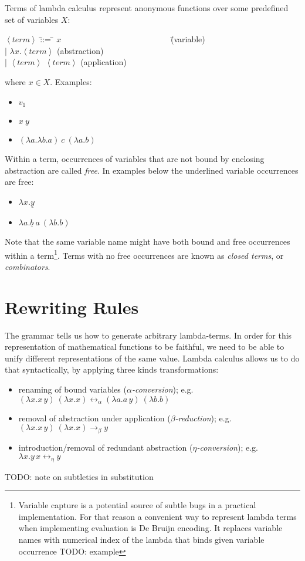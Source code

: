 \documentclass[11pt,twoside,a4paper]{article} %
\newcommand{\nonterm}[1]{$\left<#1\right>$}
\newcommand{\alt}[0]{$|$}
\begin{document}
Terms of lambda calculus represent anonymous functions over some predefined set of 
variables $X$:
\begin{tabbing}
\nonterm{term} \= ::=  \= $x$~~~~~~~~~~~~~~~~~~~~~~~~~~ \= (variable)    \\
               \> \alt \> $\lambda x.$\nonterm{term}    \> (abstraction) \\
               \> \alt \> \nonterm{term} \nonterm{term} \> (application) \\
\end{tabbing}
where $x\in X$. Examples:
\begin{itemize}
\item $v_1$
\item $x\ y$
\item $(\lambda a.\lambda b.a)\ c\ (\lambda a.b)$
\end{itemize}
Within a term, occurrences of variables that are not bound by enclosing abstraction
are called \emph{free}. In examples below the underlined variable occurrences
are free:
\begin{itemize}
\item $\lambda x.\underline{y}$
\item $\lambda a.\underline{b}\ a\ (\lambda b.b)$
\end{itemize}
Note that the same variable name might have both bound and free occurrences
within a term\footnote{Variable capture is a potential source of subtle bugs
in a practical implementation. For that reason a convenient way to represent 
lambda terms when implementing evaluation is De Bruijn encoding. It replaces
variable names with numerical index of the lambda that binds given variable
occurrence TODO: example}. Terms with no free occurrences are known as
\emph{closed terms}, or \emph{combinators}.

\section{Rewriting Rules}

The grammar tells us how to generate arbitrary lambda-terms. In order for this 
representation of mathematical functions to be faithful, we need to be able to unify
different representations of the same value. Lambda calculus allows us to do that 
syntactically, by applying three kinds transformations:
\begin{itemize}
\item renaming of bound variables (\emph{$\alpha$-conversion}); e.g. $(\lambda
x.x\,y)\ (\lambda x.x)\longleftrightarrow_\alpha(\lambda
a.a\,y)\ (\lambda b.b)$
\item removal of abstraction under application (\emph{$\beta$-reduction}); e.g. $(\lambda
x.x\,y)\ (\lambda x.x)\longrightarrow_\beta y$
\item introduction/removal of redundant abstraction (\emph{$\eta$-conversion});
e.g. $\lambda x.y\,x\longleftrightarrow_\eta y$
\end{itemize}
TODO: note on subtleties in substitution
\end{document}
